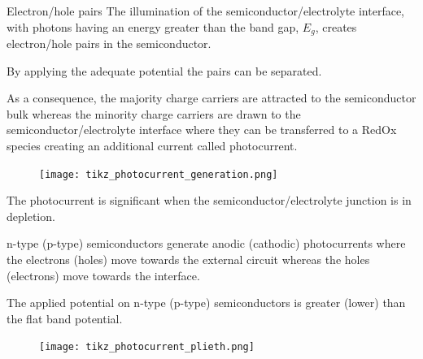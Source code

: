 \documentclass[10pt,compress,handout]{beamer}
\begin{document}
    \begin{frame}[allowframebreaks=1.0]{Electron/hole pairs}
        The illumination of the semiconductor/electrolyte interface, 
        with photons having an energy greater than the band gap, $E_g$, creates 
        electron/hole pairs in the semiconductor. 
        
        By applying the adequate potential the pairs can be separated. 
        
        As a consequence, the majority charge carriers are attracted to the 
        semiconductor bulk whereas the minority charge carriers are drawn to the 
        semiconductor/electrolyte interface where they can be transferred to a RedOx 
        species creating an additional current called photocurrent. 
    
        \begin{figure}[h]
            \centering
            \texttt{[image: tikz\_photocurrent\_generation.png]}
            \label{fig_photocurrent_generation}
        \end{figure}
    
        The photocurrent is significant when the semiconductor/electrolyte junction 
        is in depletion. 
        
        n-type (p-type) 
        semiconductors generate anodic (cathodic) photocurrents where the 
        electrons (holes) move towards the external circuit whereas the holes (electrons) 
        move towards the interface. 
        
        The applied potential on n-type (p-type) semiconductors is 
        greater (lower) than the flat band potential. 

        \begin{figure}[h]
            \centering
            \texttt{[image: tikz\_photocurrent\_plieth.png]}
            \label{fig_photocurrent_plieth}
        \end{figure}

    \end{frame}
\end{document}
